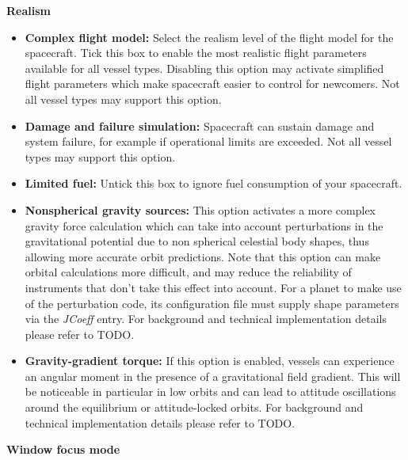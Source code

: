 \documentclass[Orbiter User Manual.tex]{subfiles}
\begin{document}
\begin{figure}[H]
	\centering
\end{figure}

\noindent
\textbf{Realism}

\begin{itemize}
\item \textbf{Complex flight model:} Select the realism level of the flight model for the spacecraft. Tick this box to enable the most realistic flight parameters available for all vessel types. Disabling this option may activate simplified flight parameters which make spacecraft easier to control for newcomers. Not all vessel types may support this option.
\item \textbf{Damage and failure simulation:} Spacecraft can sustain damage and system failure, for example if operational limits are exceeded. Not all vessel types may support this option.
\item \textbf{Limited fuel:} Untick this box to ignore fuel consumption of your spacecraft.
\item \textbf{Nonspherical gravity sources:} This option activates a more complex gravity force calculation which can take into account perturbations in the gravitational potential due to non spherical celestial body shapes, thus allowing more accurate orbit predictions. Note that this option can make orbital calculations more difficult, and may reduce the reliability of instruments that don’t take this effect into account. For a planet to make use of the perturbation code, its configuration file must supply shape parameters via the \textit{JCoeff} entry. For background and technical implementation details please refer to TODO.
\item \textbf{Gravity-gradient torque:} If this option is enabled, vessels can experience an angular moment in the presence of a gravitational field gradient. This will be noticeable in particular in low orbits and can lead to attitude oscillations around the equilibrium or attitude-locked orbits. For background and technical implementation details please refer to TODO.
\end{itemize}

\noindent
\textbf{Window focus mode}
\end{document}
